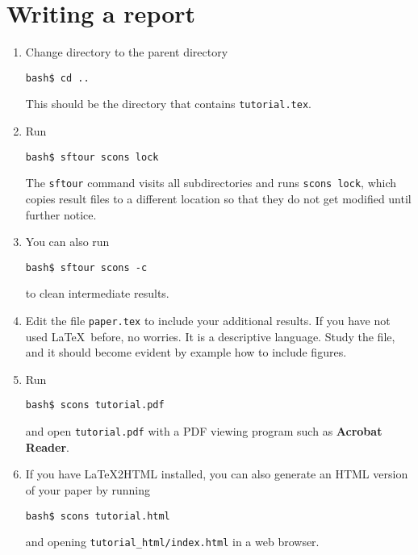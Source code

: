 \section{Writing a report}

\begin{enumerate}
\item Change directory to the parent directory
\begin{verbatim}
bash$ cd ..
\end{verbatim}
This should be the directory that contains \texttt{tutorial.tex}.
\item Run
\begin{verbatim}
bash$ sftour scons lock
\end{verbatim}
The \texttt{sftour} command visits all subdirectories and runs \texttt{scons lock}, which copies result files to a different location so that they do not get modified until further notice.
\item You can also run
\begin{verbatim}
bash$ sftour scons -c
\end{verbatim}
to clean intermediate results.
\item Edit the file \texttt{paper.tex} to include your additional results. If you have not used \LaTeX\ before, no worries. It is a descriptive language. Study the file, and it should become evident by example how to include figures.
\item Run
\begin{verbatim}
bash$ scons tutorial.pdf
\end{verbatim}
and open \texttt{tutorial.pdf} with a PDF viewing program such as \textbf{Acrobat Reader}. 

\item If you have \LaTeX2HTML installed, you can also generate an HTML version of your paper by running
\begin{verbatim}
bash$ scons tutorial.html
\end{verbatim}
and opening \verb#tutorial_html/index.html# in a web browser.
\end{enumerate}

\lstset{language=python,numbers=left,numberstyle=\tiny,showstringspaces=false}



%








